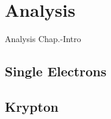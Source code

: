\chapter{Analysis}
\label{chap:Analysis}

Analysis Chap.-Intro

\section{Single Electrons}
\label{sec:SE}



\newpage

\newpage

\newpage

\newpage

\newpage

\section{Krypton}
\label{sec:Kr}



\newpage

\newpage

\newpage

\newpage

\newpage

\newpage

\newpage

\newpage
